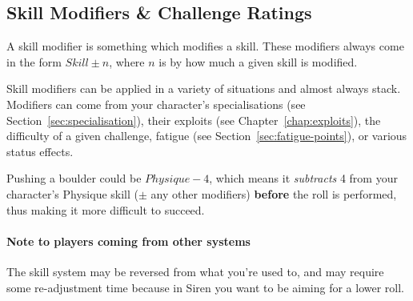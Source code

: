 \subsection{Skill Modifiers \& Challenge Ratings}
A skill modifier is something which modifies a skill.
These modifiers always come in the form $Skill \pm n$, where $n$ is by how much a given skill is modified.

Skill modifiers can be applied in a variety of situations and almost always stack.
Modifiers can come from your character's specialisations (see Section~\ref{sec:specialisation}), their exploits (see Chapter~\ref{chap:exploits}), the difficulty of a given challenge, fatigue (see Section~\ref{sec:fatigue-points}), or various status effects.

Pushing a boulder could be $\mathit{Physique} - 4$, which means it \textit{subtracts} 4 from your character's Physique skill ($\pm$ any other modifiers) \textbf{before} the roll is performed, thus making it more difficult to succeed.

\paragraph{Note to players coming from other systems} The skill system may be reversed from what you're used to, and may require some re-adjustment time because in Siren you want to be aiming for a lower roll.
\newpage
